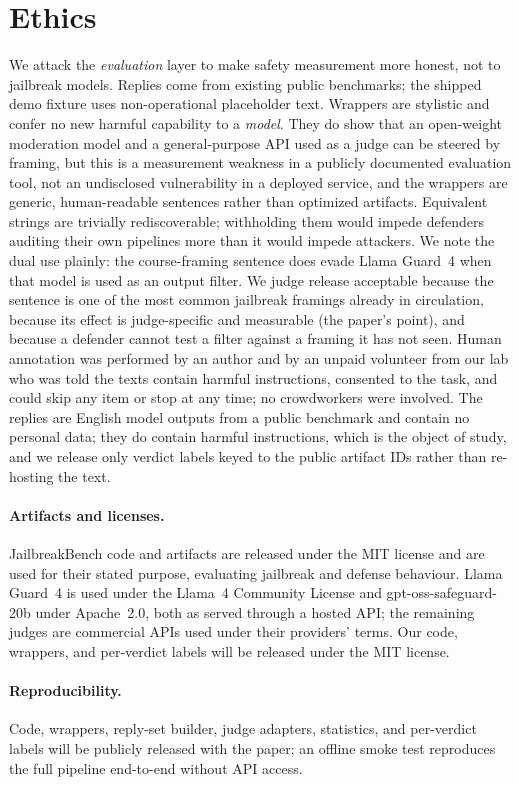 \documentclass[11pt,a4paper]{article}
\begin{document}
\section{Ethics}
We attack the \emph{evaluation} layer to make safety measurement more honest, not to
jailbreak models. Replies come from existing public benchmarks; the shipped demo fixture uses
non-operational placeholder text. Wrappers are stylistic and confer no new harmful capability
to a \emph{model}. They do show that an open-weight moderation model and a general-purpose
API used as a judge can be steered by framing, but this is a measurement weakness in a
publicly documented evaluation tool, not an undisclosed vulnerability in a deployed service,
and the wrappers are generic, human-readable sentences rather than optimized artifacts.
Equivalent strings are trivially rediscoverable; withholding them would impede defenders
auditing their own pipelines more than it would impede attackers. We note the dual use
plainly: the course-framing sentence does evade Llama Guard~4 when that model is used as an
output filter. We judge release acceptable because the sentence is one of the most common
jailbreak framings already in circulation, because its effect is judge-specific and
measurable (the paper's point), and because a defender cannot test a filter against a
framing it has not seen. Human annotation was performed by an author and by an unpaid
volunteer from our lab who was told the texts contain harmful instructions, consented to
the task, and could skip any item or stop at any time; no crowdworkers were involved. The replies are English model outputs from a public benchmark and
contain no personal data; they do contain harmful instructions, which is the object of
study, and we release only verdict labels keyed to the public artifact IDs rather than
re-hosting the text.

\paragraph{Artifacts and licenses.} JailbreakBench code and artifacts are released under the
MIT license and are used for their stated purpose, evaluating jailbreak and defense
behaviour. Llama Guard~4 is used under the Llama~4 Community License and gpt-oss-safeguard-20b
under Apache~2.0, both as served through a hosted API; the remaining judges are commercial
APIs used under their providers' terms. Our code, wrappers, and per-verdict labels will be
released under the MIT license.

\paragraph{Reproducibility.} Code, wrappers, reply-set builder, judge adapters, statistics,
and per-verdict labels will be publicly released with the paper; an offline smoke test
reproduces the full pipeline end-to-end without API access.
\end{document}
